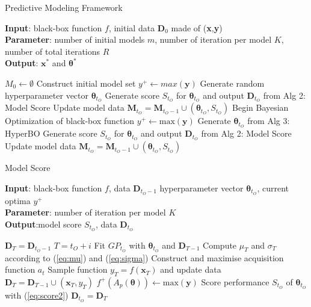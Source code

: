 \documentclass{article}
\begin{document}
\begin{algorithm}[t]
	\caption{Predictive Modeling Framework}
	\label{alg:AMMSF}
	\textbf{Input}: black-box function $f$, initial data $\boldsymbol{D}_0$ made of (\textbf{x},\textbf{y})\\
	\textbf{Parameter}: number of initial models $m$, number of iteration per model $K$, number of total iterations $R$\\
	\textbf{Output}: $\boldsymbol{x}^{*}$ and $\boldsymbol{\theta}^{*}$
	\begin{algorithmic}[1] %
		\STATE $M_0 \gets \emptyset$
		\STATE Construct initial model set
		\STATE $y^{+} \leftarrow max(\boldsymbol{y})$
		\STATE Generate random hyperparameter vector $\boldsymbol{\theta}_{t_{O}}$
		\STATE Generate score $S_{t_{O}}$ for $\boldsymbol{\theta}_{t_{O}}$ and output $\boldsymbol{D}_{t_{O}}$ from Alg 2: Model Score
		\STATE Update model data $\boldsymbol{M}_{t_{O}}=\boldsymbol{M}_{t_{O}-1} \cup (\boldsymbol{\theta}_{t_{O}},S_{t_{O}})$
		\ENDFOR
		\STATE Begin Bayesian Optimization of black-box function
		\STATE $y^{+} \leftarrow \text{max}(\boldsymbol{y})$
		\STATE Generate $\boldsymbol{\theta}_{t_{O}}$ from Alg 3: HyperBO
		\STATE Generate score $S_{t_{O}}$ for $\boldsymbol{\theta}_{t_{O}}$ and output $\boldsymbol{D}_{t_{O}}$ from Alg 2: Model Score
		\STATE Update model data $\boldsymbol{M}_{t_{O}}=\boldsymbol{M}_{t_{O}-1} \cup (\boldsymbol{\theta}_{t_{O}},S_{t_{O}})$
		\ENDWHILE
	\end{algorithmic}
\end{algorithm}
\begin{algorithm}
	\caption{Model Score}
	\label{alg:ScoringModel}
	\textbf{Input}: black-box function $f$, data $\boldsymbol{D}_{t_{O}-1}$ hyperparameter vector $\boldsymbol{\theta}_{t_{O}}$, current optima $y^{+}$\\
	\textbf{Parameter}: number of iteration per model $K$\\
	\textbf{Output}:model score $S_{t_{O}}$, data $\boldsymbol{D}_{t_{O}}$
	\begin{algorithmic}[1]
		\STATE $\boldsymbol{D}_{T} = \boldsymbol{D}_{t_{O}-1}$
		\STATE $T = t_{O}+i$
		\STATE Fit $GP_{t_{O}}$ with $\boldsymbol{\theta}_{t_{O}}$ and $\boldsymbol{D}_{T-1}$
		\STATE Compute $\mu_{T}$ and $\sigma_{T}$ according to (\ref{eq:mu}) and (\ref{eq:sigma})
		\STATE Construct and maximise acquisition function $a_{t}$
		\STATE Sample function $y_{T} = f(\boldsymbol{x}_{T})$ and update data $\boldsymbol{D}_{T} = \boldsymbol{D}_{{T}-1} \cup (\boldsymbol{x}_{T},y_{T})$
		\ENDFOR
		\STATE $f^{+}(A_p(\boldsymbol{\theta})) \leftarrow \text{max}(\boldsymbol{y})$
		\STATE Score performance $S_{t_{O}}$ of $\boldsymbol{\theta}_{t_{O}}$ with (\ref{eq:score2})
		\STATE $\boldsymbol{D}_{t_O} = \boldsymbol{D}_{T}$
	\end{algorithmic}
\end{algorithm}
\end{document}
